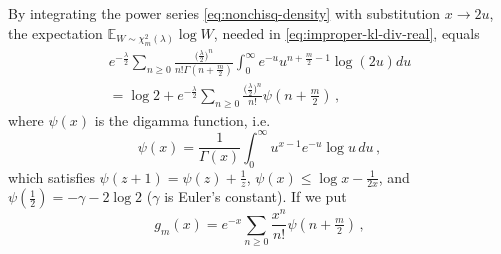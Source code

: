 \documentclass[a4paper,10pt,twocolumn]{article}
\begin{document}
By integrating the power series \eqref{eq:nonchisq-density} with substitution $x \to 2u$,
the expectation $
  \mathbb{E}_{W\sim \chi^2_m(\lambda)} \log W
$, needed in \eqref{eq:improper-kl-div-real}, equals
\begin{multline}  \label{eq:exp-log-chisq-proof}
    e^{- \tfrac\lambda2} \sum_{n \geq 0}
        \frac{\bigl(\tfrac\lambda2\bigr)^n}{
          n! \Gamma(n + \tfrac{m}2)
        }
    \int_0^\infty
        e^{- u} u^{n + \tfrac{m}2 - 1}
        \log{(2 u)} du
    \\
    = \log{2}
    + e^{- \tfrac\lambda2} \sum_{n \geq 0}
        \frac{\bigl(\tfrac\lambda2\bigr)^n}{n!}
        \psi(n + \tfrac{m}2)
    \,,
\end{multline}
where $\psi(x)$ is the digamma function, i.e.
\begin{equation}  \label{eq:digamma}
  \psi(x)
    = \frac1{\Gamma(x)}
      \int_0^\infty
        u^{x-1} e^{-u} \log{u}
      \, du
    \,,
\end{equation}
which satisfies $
  \psi(z+1) = \psi(z) + \tfrac1z
$, $
  \psi(x)\leq \log x - \tfrac1{2x}
$, and $
  \psi(\tfrac12) = -\gamma - 2\log 2
$ ($\gamma$ is Euler's constant). If we put
\begin{equation}  \label{eq:g-m-series}
  g_m(x)
    = e^{-x} \sum_{n \geq 0} \frac{x^n}{n!} \psi(n + \tfrac{m}2)
    \,,
\end{equation}
\end{document}
